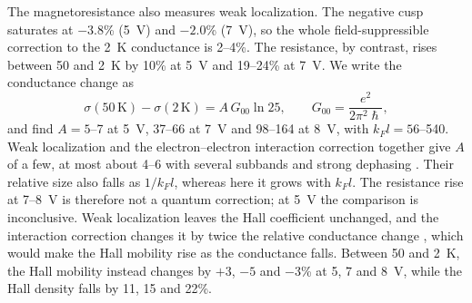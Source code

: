 \documentclass[11pt]{article}
\begin{document}
The magnetoresistance also measures weak localization. The negative cusp saturates at $-3.8$\% (5~V) and $-2.0$\% (7~V), so the whole field-suppressible correction to the 2~K conductance is 2--4\%. The resistance, by contrast, rises between 50 and 2~K by 10\% at 5~V and 19--24\% at 7~V. We write the conductance change as
\begin{equation}
\sigma(50\,\mathrm{K})-\sigma(2\,\mathrm{K})=A\,G_{00}\ln 25,\qquad G_{00}=\frac{e^2}{2\pi^2\hslash},
\end{equation}
and find $A=5$--7 at 5~V, 37--66 at 7~V and 98--164 at 8~V, with $k_Fl=56$--540. Weak localization and the electron--electron interaction correction together give $A$ of a few, at most about 4--6 with several subbands and strong dephasing \cite{AltshulerAronov1980,LeeRamakrishnan1985}. Their relative size also falls as $1/k_Fl$, whereas here it grows with $k_Fl$. The resistance rise at 7--8~V is therefore not a quantum correction; at 5~V the comparison is inconclusive. Weak localization leaves the Hall coefficient unchanged, and the interaction correction changes it by twice the relative conductance change \cite{AltshulerAronov1980,LeeRamakrishnan1985}, which would make the Hall mobility rise as the conductance falls. Between 50 and 2~K, the Hall mobility instead changes by $+3$, $-5$ and $-3$\% at 5, 7 and 8~V, while the Hall density falls by 11, 15 and 22\%.
\end{document}
